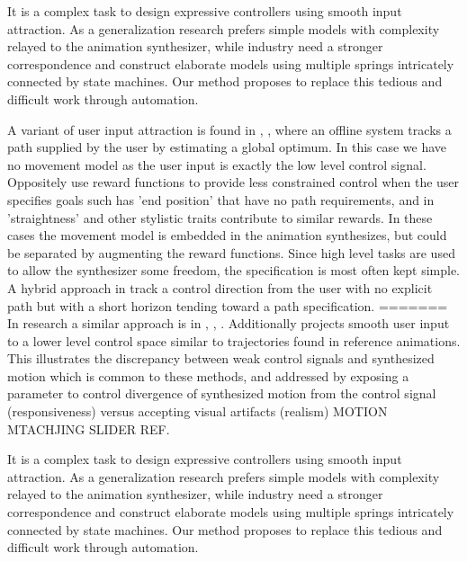 It is a complex task to design expressive controllers using smooth input attraction. As a generalization research prefers simple models with complexity relayed to the animation synthesizer, while industry need a stronger correspondence and construct elaborate models using multiple springs intricately connected by state machines. Our method proposes to replace this tedious and difficult work through automation. 

A variant of user input attraction is found in \citep{lee03}, \citep{safanona07}, \citep{treuille07} where an offline system tracks a path supplied by the user by estimating a global optimum. In this case we have no movement model as the user input is exactly the low level control signal. Oppositely \citep{kovar02} use reward functions to provide less constrained control when the user specifies goals such has 'end position' that have no path requirements, and in \citep{lee18} 'straightness' and other stylistic traits contribute to similar rewards. In these cases the movement model is embedded in the animation synthesizes, but could be separated by augmenting the reward functions. Since high level tasks are used to allow the synthesizer some freedom, the specification is most often kept simple. A hybrid approach in \citep{lee10} track a control direction from the user with no explicit path but with a short horizon tending toward a path specification.
=======
In research a similar approach is in \citep{mccann07}, \citep{holden.16}, \citep{Zhang18}. Additionally \citep{startke20} projects smooth user input to a lower level control space similar to trajectories found in reference animations. This illustrates the discrepancy between weak control signals and synthesized motion which is common to these methods, and addressed by exposing a parameter to control divergence of synthesized motion from the control signal (responsiveness) versus accepting visual artifacts (realism) MOTION MTACHJING SLIDER REF. 

It is a complex task to design expressive controllers using smooth input attraction. As a generalization research prefers simple models with complexity relayed to the animation synthesizer, while industry need a stronger correspondence and construct elaborate models using multiple springs intricately connected by state machines. Our method proposes to replace this tedious and difficult work through automation. 

